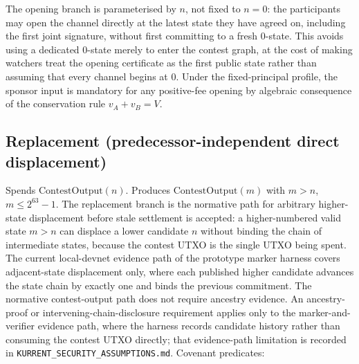 \documentclass[10pt,a4paper]{article}
\begin{document}
The opening branch is parameterised by $n$, not fixed to $n=0$: the participants may open the channel directly at the latest state they have agreed on, including the first joint signature, without first committing to a fresh $0$-state. This avoids using a dedicated $0$-state merely to enter the contest graph, at the cost of making watchers treat the opening certificate as the first public state rather than assuming that every channel begins at $0$. Under the fixed-principal profile, the sponsor input is mandatory for any positive-fee opening by algebraic consequence of the conservation rule $v_A + v_B = V$.

\subsection{Replacement (predecessor-independent direct displacement)}
Spends $\mathrm{ContestOutput}(n)$. Produces $\mathrm{ContestOutput}(m)$ with $m > n$, $m \le 2^{63}-1$. The replacement branch is the normative path for arbitrary higher-state displacement before stale settlement is accepted: a higher-numbered valid state $m > n$ can displace a lower candidate $n$ without binding the chain of intermediate states, because the contest UTXO is the single UTXO being spent. The current local-devnet evidence path of the prototype marker harness covers adjacent-state displacement only, where each published higher candidate advances the state chain by exactly one and binds the previous commitment. The normative contest-output path does not require ancestry evidence. An ancestry-proof or intervening-chain-disclosure requirement applies only to the marker-and-verifier evidence path, where the harness records candidate history rather than consuming the contest UTXO directly; that evidence-path limitation is recorded in \texttt{KURRENT\_SECURITY\_ASSUMPTIONS.md}. Covenant predicates:
\end{document}

